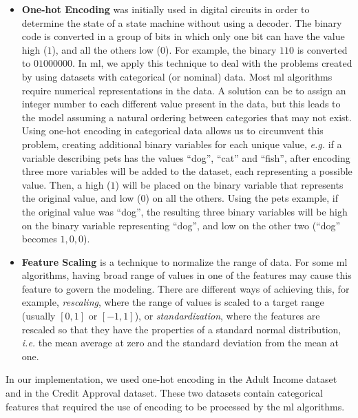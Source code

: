 \begin{itemize}
    \setlength\itemsep{1em}

	\item\textbf{One-hot Encoding}\cite{harris2010digital} was initially used in digital circuits in order to determine the state of a state machine without using a decoder. The binary code is converted in a group of bits in which only one bit can have the value high ($1$), and all the others low ($0$). For example, the binary $110$ is converted to $01000000$.
	In \ac{ml}, we apply this technique to deal with the problems created by using datasets with categorical (or nominal) data. Most \ac{ml} algorithms require numerical representations in the data. A solution can be to assign an integer number to each different value present in the data, but this leads to the model assuming a natural ordering between categories that may not exist.
	Using one-hot encoding in categorical data allows us to circumvent this problem, creating additional binary variables for each unique value, \textit{e.g.} if a variable describing pets has the values ``dog'', ``cat'' and ``fish'', after encoding three more variables will be added to the dataset, each representing a possible value. Then, a high ($1$) will be placed on the binary variable that represents the original value, and low ($0$) on all the others. Using the pets example, if the original value was ``dog'', the resulting three binary variables will be high on the binary variable representing ``dog'', and low on the other two (``dog'' becomes $1,0,0$).

	\item\textbf{Feature Scaling} is a technique to normalize the range of data. For some \ac{ml} algorithms, having broad range of values in one of the features may cause this feature to govern the modeling. There are different ways of achieving this, for example, \textit{rescaling}, where the range of values is scaled to a target range (usually $[0,1]$ or $[-1,1]$), or \textit{standardization}, where the features are rescaled so that they have the properties of a standard normal distribution, \textit{i.e.} the mean average at zero and the standard deviation from the mean at one.



\end{itemize}

In our implementation, we used one-hot encoding in the Adult Income dataset and in the Credit Approval dataset. These two datasets contain categorical features that required the use of encoding to be processed by the \ac{ml} algorithms.

